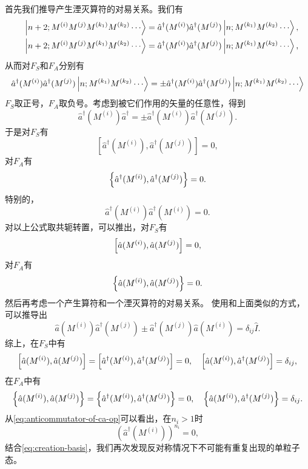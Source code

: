\documentclass[hyperref, UTF8, a4paper]{ctexart}
\begin{document}
首先我们推导产生湮灭算符的对易关系。我们有
\[
    \begin{split}
        \ket{n+2;M^{(i)}M^{(j)}M^{(k_1)}M^{(k_2)} \cdots} = \hat{a}^\dagger (M^{(i)}) \hat{a}^\dagger (M^{(j)}) \ket{n; M^{(k_1)}M^{(k_2)} \cdots}, \\ 
        \quad \ket{n+2;M^{(i)}M^{(j)}M^{(k_1)}M^{(k_2)} \cdots} = \hat{a}^\dagger (M^{(i)}) \hat{a}^\dagger (M^{(j)}) \ket{n; M^{(k_1)}M^{(k_2)} \cdots},
    \end{split}
\]
从而对$F_S$和$F_A$分别有
\[
    \hat{a}^\dagger (M^{(i)}) \hat{a}^\dagger (M^{(j)}) \ket{n; M^{(k_1)}M^{(k_2)} \cdots} = \pm \hat{a}^\dagger (M^{(i)}) \hat{a}^\dagger (M^{(j)}) \ket{n; M^{(k_1)}M^{(k_2)} \cdots}
\]
$F_S$取正号，$F_A$取负号。考虑到被它们作用的矢量的任意性，得到
\[
    \hat{a}^\dagger (M^{(i)}) \hat{a}^\dagger = \pm \hat{a}^\dagger (M^{(i)}) \hat{a}^\dagger (M^{(j)}).
\]
于是对$F_S$有
\[
    [\hat{a}^\dagger (M^{(i)}), \hat{a}^\dagger (M^{(j)})] = 0,
\]
对$F_A$有
\[
    \acomm{\hat{a}^\dagger (M^{(i)})}{\hat{a}^\dagger (M^{(j)})} = 0.
\]
特别的，
\[
    \hat{a}^\dagger (M^{(i)}) \hat{a}^\dagger (M^{(i)}) = 0.
\]
对以上公式取共轭转置，可以推出，对$F_S$有
\[
    \comm{\hat{a}(M^{(i)})}{\hat{a}(M^{(j)})} = 0,
\]
对$F_A$有
\[
    \acomm{\hat{a}(M^{(i)})}{\hat{a}(M^{(j)})} = 0.
\]
然后再考虑一个产生算符和一个湮灭算符的对易关系。
使用和上面类似的方式，可以推导出
\[
    \hat{a}(M^{(i)}) \hat{a}^\dagger (M^{(j)}) \pm \hat{a}^\dagger (M^{(j)}) \hat{a} (M^{(i)}) = \delta_{ij} \hat{I}.
\]
综上，在$F_S$中有
\begin{equation}
    \comm{\hat{a}(M^{(i)})}{\hat{a}(M^{(j)})} = \comm{\hat{a}^\dagger(M^{(i)})}{\hat{a}^\dagger(M^{(j)})} = 0, \quad \comm{\hat{a} (M^{(i)})}{\hat{a}^\dagger (M^{(j)})} = \delta_{ij},
    \label{eq:commutator-of-ca-op}
\end{equation}
在$F_A$中有
\begin{equation}
    \acomm{\hat{a}(M^{(i)})}{\hat{a}(M^{(j)})} = \acomm{\hat{a}^\dagger(M^{(i)})}{\hat{a}^\dagger(M^{(j)})} = 0, \quad \acomm{\hat{a} (M^{(i)})}{\hat{a}^\dagger (M^{(j)})} = \delta_{ij}.
    \label{eq:anticommutator-of-ca-op}
\end{equation}
从\eqref{eq:anticommutator-of-ca-op}可以看出，在$n_i > 1$时
\[
    \left( \hat{a}^\dagger (M^{(i)}) \right)^{n_i} = 0,
\]
结合\eqref{eq:creation-basis}，我们再次发现反对称情况下不可能有重复出现的单粒子态。
\end{document}
